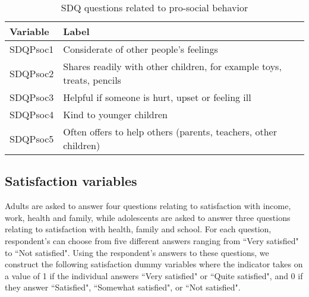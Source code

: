 \begin{table}[H]
\begin{center}
\footnotesize{
\caption{SDQ questions related to pro-social behavior}
\begin{tabular}{l l}
\hline
\textbf{Variable} & \textbf{Label} \\
\hline
SDQPsoc1 & Considerate of other people's feelings\\
SDQPsoc2 & Shares readily with other children, for example toys, treats, pencils\\
SDQPsoc3 & Helpful if someone is hurt, upset or feeling ill\\
SDQPsoc4 & Kind to younger children\\
SDQPsoc5 & Often offers to help others (parents, teachers, other children)\\
\hline
\end{tabular}
}
\end{center}
\end{table}

\subsection{Satisfaction variables}

Adults are asked to answer four questions relating to satisfaction with income, work, health and family, while adolescents are asked to answer three questions relating to satisfaction with health, family and school. For each question, respondent's can choose from five different answers ranging from ``Very satisfied" to ``Not satisfied". Using the respondent's answers to these questions, we construct the following satisfaction dummy variables where the indicator takes on a value of 1 if the individual answers ``Very satisfied" or ``Quite satisfied", and 0 if they answer ``Satisfied", ``Somewhat satisfied", or ``Not satisfied".

